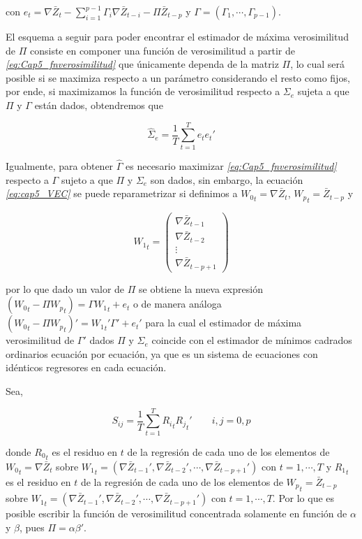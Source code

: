 con $e_t=\nabla \bar{Z}_t-\sum_{i=1}^{p-1}\Gamma_i\nabla\bar{Z}_{t-i} - \Pi\bar{Z}_{t-p}$ y $\Gamma=(\Gamma_1,\cdots, \Gamma_{p-1})$.\bigskip 

El esquema a seguir para poder encontrar el estimador de máxima verosimilitud de $\Pi$ consiste en componer una función de verosimilitud a partir de \textit{\ref{eq:Cap5_fnverosimilitud}} que únicamente dependa de la matriz $\Pi$, lo cual será posible si se maximiza respecto a un parámetro considerando el resto como fijos, por ende, si maximizamos la función de verosimilitud respecto a $\Sigma_e$ sujeta a que $\Pi$ y $\Gamma$ están dados, obtendremos que

\begin{equation}
\widehat{\Sigma}_e=\frac{1}{T}\sum_{t=1}^{T}e_te_t'
\end{equation} 
 
 Igualmente, para obtener $\widehat{\Gamma}$ es necesario maximizar \textit{\ref{eq:Cap5_fnverosimilitud}} respecto a $\Gamma$ sujeto a que $\Pi$ y $\Sigma_e$ son dados, sin embargo, la ecuación  \textit{\ref{eq:cap5_VEC}} se puede reparametrizar si definimos a ${W_0}_t= \nabla \bar{Z}_t$, ${W_p}_t=\bar{Z}_{t-p}$ y 
 
 \begin{equation}
 {W_1}_t=\begin{pmatrix}
\nabla \bar{Z}_{t-1}\\ 
\nabla \bar{Z}_{t-2}\\ 
\vdots\\ 
\nabla \bar{Z}_{t-p+1}
\end{pmatrix}
 \end{equation}
 
 por lo que dado un valor de $\Pi$ se obtiene la nueva expresión $( {W_0}_t - \Pi {W_p}_t)=\Gamma {W_1}_t + e_t$ o de manera análoga $ ({W_0}_t - \Pi {W_p}_t)'= {W_1}_t'\Gamma' + e_t'$ para la cual el estimador de máxima verosimilitud de $\Gamma'$ dados $\Pi$ y $\Sigma_e$ coincide con el estimador de mínimos cadrados ordinarios ecuación por ecuación, ya que es un sistema de ecuaciones con idénticos regresores en cada ecuación. \bigskip 
 
 Sea,
 
 \begin{equation}
 S_{ij}=\frac{1}{T} \sum_{t=1}^{T}{R_i}_t{R_j}_t' \qquad  i,j=0,p
 \end{equation}
 
 donde ${R_0}_t$ es el residuo en $t$ de la regresión de cada uno de los elementos de $ {W_0}_t =\nabla \bar{Z}_{t}$ sobre ${W_1}_t =(\nabla \bar{Z}_{t-1}', \nabla \bar{Z}_{t-2}',\cdots, \nabla \bar{Z}_{t-p+1}' )$ con $t=1, \cdots, T$ y ${R_1}_t$ es el residuo en $t$ de la regresión de cada uno de los elementos de ${W_p}_t=\bar{Z}_{t-p}$ sobre $ {W_1}_t =(\nabla \bar{Z}_{t-1}', \nabla \bar{Z}_{t-2}',\cdots, \nabla \bar{Z}_{t-p+1}' )$ con $t=1, \cdots, T$. Por lo que es posible escribir la función de verosimilitud concentrada solamente en función de $\alpha$ y $\beta$, pues $\Pi=\alpha\beta'$.
 

